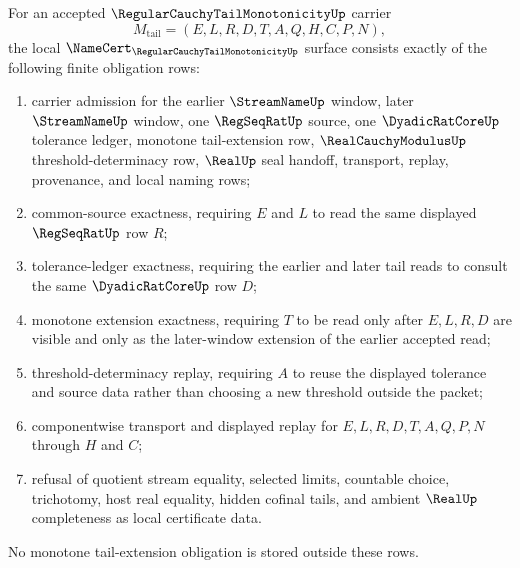 \begin{definition}
\label{def:regular-cauchy-tail-monotonicity-obligation-surface}
For an accepted $\RegularCauchyTailMonotonicityUp$ carrier
$$
M_{\mathrm{tail}}=(E,L,R,D,T,A,Q,H,C,P,N),
$$
the local $\NameCert_{\RegularCauchyTailMonotonicityUp}$ surface consists exactly of the following finite obligation rows:
\begin{enumerate}
\item carrier admission for the earlier $\StreamNameUp$ window, later $\StreamNameUp$ window, one $\RegSeqRatUp$ source, one $\DyadicRatCoreUp$ tolerance ledger, monotone tail-extension row, $\RealCauchyModulusUp$ threshold-determinacy row, $\RealUp$ seal handoff, transport, replay, provenance, and local naming rows;
\item common-source exactness, requiring $E$ and $L$ to read the same displayed $\RegSeqRatUp$ row $R$;
\item tolerance-ledger exactness, requiring the earlier and later tail reads to consult the same $\DyadicRatCoreUp$ row $D$;
\item monotone extension exactness, requiring $T$ to be read only after $E,L,R,D$ are visible and only as the later-window extension of the earlier accepted read;
\item threshold-determinacy replay, requiring $A$ to reuse the displayed tolerance and source data rather than choosing a new threshold outside the packet;
\item componentwise transport and displayed replay for $E,L,R,D,T,A,Q,P,N$ through $H$ and $C$;
\item refusal of quotient stream equality, selected limits, countable choice, trichotomy, host real equality, hidden cofinal tails, and ambient $\RealUp$ completeness as local certificate data.
\end{enumerate}
No monotone tail-extension obligation is stored outside these rows.
\end{definition}

